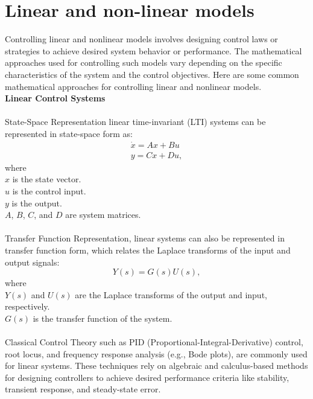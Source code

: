 \documentclass[12pt]{report}
\begin{document}
\section{Linear and non-linear models}
Controlling linear and nonlinear models involves designing control laws or strategies
to achieve desired system behavior or performance. The mathematical approaches used for
controlling such models vary depending on the specific characteristics of the system
and the control objectives. Here are some common mathematical approaches for
controlling linear and nonlinear models.\\
\newpage
\noindent \textbf{Linear Control Systems}\\
\\
State-Space Representation linear time-invariant (LTI) systems can be represented in state-space form as:
    \begin{equation}
        \begin{split}
        \dot{x} = Ax + Bu\\
        y = Cx + Du,
        \end{split}
    \end{equation}
   where\\
    \( x \) is the state vector.\\
    \( u \) is the control input.\\
    \( y \) is the output.\\
    \( A \), \( B \), \( C \), and \( D \) are system matrices.\\
\\
Transfer Function Representation, linear systems can also be represented in transfer function form, which relates the Laplace transforms of the input and output signals:
    \begin{equation}
    Y(s) = G(s) U(s),
    \end{equation}
   where\\
   \( Y(s) \) and \( U(s) \) are the Laplace transforms of the output and input, respectively.\\
   \( G(s) \) is the transfer function of the system.\\
\\
Classical Control Theory such as PID (Proportional-Integral-Derivative) control, root locus, and frequency response analysis (e.g., Bode plots), are commonly used for linear systems. These techniques rely on algebraic and calculus-based methods for designing controllers to achieve desired performance criteria like stability, transient response, and steady-state error.\\
\end{document}
